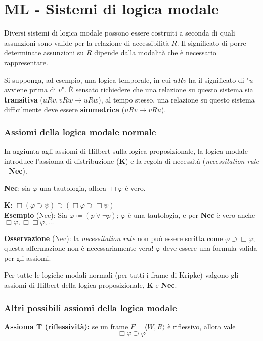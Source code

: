 \chapter{ML - Sistemi di logica modale}

Diversi sistemi di logica modale possono essere costruiti a seconda di quali assunzioni sono valide per la relazione di accessibilità $R$. Il significato di porre determinate assunzioni su $R$ dipende dalla modalità che è necessario rappresentare.

Si supponga, ad esempio, una logica temporale, in cui $uRv$ ha il significato di "$u$ avviene prima di $v$". È sensato richiedere che una relazione su questo sistema sia \textbf{transitiva} ($uRv, vRw \to uRw$), al tempo stesso, una relazione su questo sistema difficilmente deve essere \textbf{simmetrica} ($uRv \to vRu$).

\subsection{Assiomi della logica modale normale}

In aggiunta agli assiomi di Hilbert sulla logica proposizionale, la logica modale introduce l'assioma di distribuzione (\textbf{K}) e la regola di necessità (\textit{necessitation rule} - \textbf{Nec}).

\textbf{Nec}: sia $\varphi$ una tautologia, allora $\Box \varphi$ è vero.

\textbf{K}: $\Box (\varphi \supset \psi) \supset (\Box \varphi \supset \Box \psi)$
\\

\textbf{Esempio} (Nec): Sia $\varphi \coloneqq (p \lor \lnot p)$; $\varphi$ è una tautologia, e per \textbf{Nec} è vero anche $\Box \varphi, \Box \Box \varphi, \dots$

\textbf{Osservazione} (Nec): la \textit{necessitation rule} non può essere scritta come $\varphi \supset \Box \varphi$; questa affermazione non è necessariamente vera! $\varphi$ deve essere una formula valida per gli assiomi.

Per tutte le logiche modali normali (per tutti i frame di Kripke) valgono gli assiomi di Hilbert della logica proposizionale, \textbf{K} e \textbf{Nec}.


\subsection{Altri possibili assiomi della logica modale}

\textbf{Assioma T (riflessività):} se un frame $F = \langle W, R \rangle$ è riflessivo, allora vale $$\Box \varphi \supset \varphi$$

